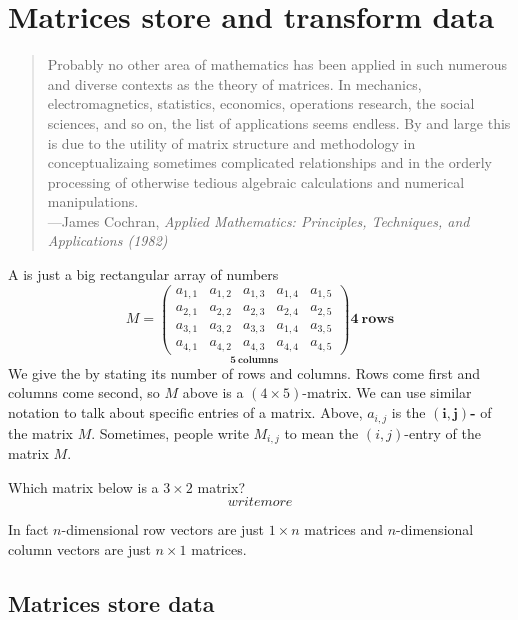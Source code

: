 \documentclass{ximera}
\begin{document}
\section{Matrices store and transform data}

\begin{quote}
  Probably no other area of mathematics has been applied in such
  numerous and diverse contexts as the theory of matrices. In
  mechanics, electromagnetics, statistics, economics, operations
  research, the social sciences, and so on, the list of applications
  seems endless. By and large this is due to the utility of matrix
  structure and methodology in conceptualizaing sometimes complicated
  relationships and in the orderly processing of otherwise tedious
  algebraic calculations and numerical manipulations. \\
  ---James Cochran, \textit{Applied Mathematics: Principles, Techniques,
  and Applications (1982)}
\end{quote}

A  is just a big rectangular array of numbers
\[
M =
\underset{\displaystyle\boldsymbol{5}~\textbf{columns}}{\begin{pmatrix}
  a_{1,1} & a_{1,2} & a_{1,3} & a_{1,4} & a_{1,5} \\
  a_{2,1} & a_{2,2} & a_{2,3} & a_{2,4} & a_{2,5} \\
  a_{3,1} & a_{3,2} & a_{3,3} & a_{1,4} & a_{3,5} \\
  a_{4,1} & a_{4,2} & a_{4,3} & a_{4,4} & a_{4,5}
\end{pmatrix}}
\boldsymbol{4}~\textbf {rows}
\]
We give the  by stating its number of rows
and columns. Rows come first and columns come second, so $M$ above is
a $(4\times 5)$-matrix. We can use similar notation to talk about
specific entries of a matrix. Above, $a_{i,j}$ is the
$\boldsymbol{(i,j)}${\bf-} of the matrix $M$. Sometimes,
people write $M_{i,j}$ to mean the $(i,j)$-entry of the matrix $M$.

\begin{question}
  Which matrix below is a $3\times 2$ matrix?
  \[
  write more
  \]
\end{question}
In fact $n$-dimensional row vectors are just $1\times n$ matrices and
$n$-dimensional column vectors are just $n\times 1$ matrices.


\subsection{Matrices store data}
\end{document}
